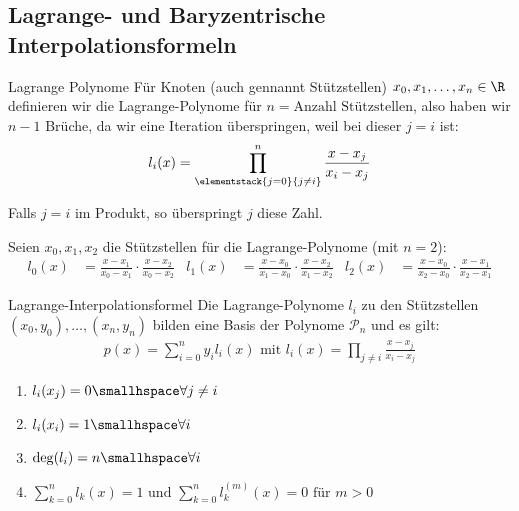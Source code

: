 
\newsection
\subsection{Lagrange- und Baryzentrische Interpolationsformeln}
\label{sec:barycentric-interpolation}

\begin{definition}[]{Lagrange Polynome}
    Für Knoten (auch gennannt Stützstellen) $x_0, x_1, \ldots, x_n \in \R$ definieren wir die Lagrange-Polynome für $n = \text{Anzahl Stützstellen}$, also haben wir $n - 1$ Brüche, da wir eine Iteration überspringen, weil bei dieser $j = i$ ist:
    \begin{align*}
        l_i(x) = \prod_{\elementstack{j = 0}{j \neq i}}^n \frac{x - x_j}{x_i - x_j}
    \end{align*}
\end{definition}
Falls $j = i$ im Produkt, so überspringt $j$ diese Zahl.

\inlineex Seien $x_0, x_1, x_2$ die Stützstellen für die Lagrange-Polynome (mit $n = 2$):
\begin{align*}
    l_0(x) & = \frac{x - x_1}{x_0 - x_1} \cdot \frac{x - x_2}{x_0 - x_2} &
    l_1(x) & = \frac{x - x_0}{x_1 - x_0} \cdot \frac{x - x_2}{x_1 - x_2} &
    l_2(x) & = \frac{x - x_0}{x_2 - x_0} \cdot \frac{x - x_1}{x_2 - x_1}
\end{align*}


\begin{theorem}[]{Lagrange-Interpolationsformel}
    Die Lagrange-Polynome $l_i$ zu den Stützstellen $(x_0, y_0), \ldots, (x_n, y_n)$ bilden eine Basis der Polynome $\mathcal{P}_n$ und es gilt:
    \begin{align*}
        p(x) = \sum_{i = 0}^{n} y_i l_i(x) \text{ mit } l_i(x) = \prod_{j \neq i} \frac{x - x_j}{x_i - x_j}
    \end{align*}
\end{theorem}


\rmvspace
\begin{multicols}{2}
    \begin{enumerate}
        \item $l_i(x_j) = 0 \smallhspace \forall j \neq i$
        \item $l_i(x_i) = 1 \smallhspace \forall i$
        \item $\deg(l_i) = n \smallhspace \forall i$
        \item $\sum_{k = 0}^{n} l_k(x) = 1 \text{ und } \sum_{k = 0}^{n} l_k^{(m)}(x) = 0 \text{ für } m > 0$
    \end{enumerate}
\end{multicols}

